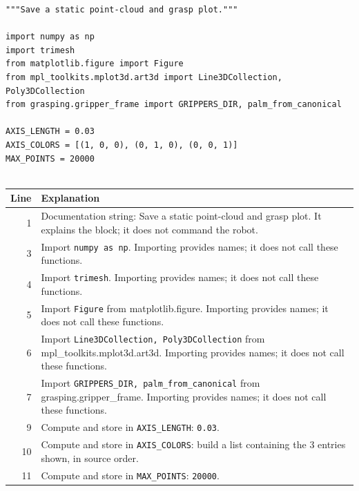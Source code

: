 \documentclass[11pt,a4paper]{book}
\begin{document}
\begin{lstlisting}[firstnumber=1]
"""Save a static point-cloud and grasp plot."""

import numpy as np
import trimesh
from matplotlib.figure import Figure
from mpl_toolkits.mplot3d.art3d import Line3DCollection, Poly3DCollection
from grasping.gripper_frame import GRIPPERS_DIR, palm_from_canonical

AXIS_LENGTH = 0.03
AXIS_COLORS = [(1, 0, 0), (0, 1, 0), (0, 0, 1)]
MAX_POINTS = 20000


\end{lstlisting}

\begin{longtable}{r p{}}

\textbf{Line} & \textbf{Explanation} \\ \hline \endhead

1 & Documentation string: Save a static point-cloud and grasp plot. It explains the block; it does not command the robot. \\

3 & Import \texttt{numpy as np}. Importing provides names; it does not call these functions. \\

4 & Import \texttt{trimesh}. Importing provides names; it does not call these functions. \\

5 & Import \texttt{Figure} from matplotlib.figure. Importing provides names; it does not call these functions. \\

6 & Import \texttt{Line3DCollection, Poly3DCollection} from mpl\_toolkits.mplot3d.art3d. Importing provides names; it does not call these functions. \\

7 & Import \texttt{GRIPPERS\_DIR, palm\_from\_canonical} from grasping.gripper\_frame. Importing provides names; it does not call these functions. \\

9 & Compute and store in \texttt{AXIS\_LENGTH}: \texttt{0.03}.  \\

10 & Compute and store in \texttt{AXIS\_COLORS}: build a list containing the 3 entries shown, in source order.  \\

11 & Compute and store in \texttt{MAX\_POINTS}: \texttt{20000}.  \\

\end{longtable}
\end{document}
